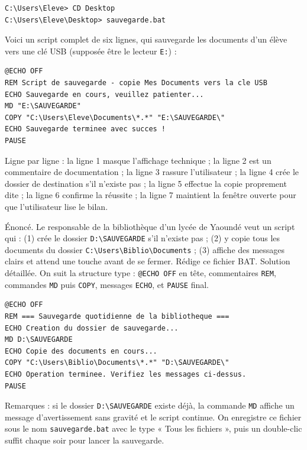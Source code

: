 \documentclass[11pt]{article}
\begin{document}
\begin{lstlisting}
C:\Users\Eleve> CD Desktop
C:\Users\Eleve\Desktop> sauvegarde.bat
\end{lstlisting}

\begin{exemplebox}
Voici un script complet de six lignes, qui sauvegarde les documents d'un élève vers une clé USB (supposée être le lecteur \texttt{E:}) :
\begin{lstlisting}
@ECHO OFF
REM Script de sauvegarde - copie Mes Documents vers la cle USB
ECHO Sauvegarde en cours, veuillez patienter...
MD "E:\SAUVEGARDE"
COPY "C:\Users\Eleve\Documents\*.*" "E:\SAUVEGARDE\"
ECHO Sauvegarde terminee avec succes !
PAUSE
\end{lstlisting}
Ligne par ligne : la ligne 1 masque l'affichage technique ; la ligne 2 est un commentaire de documentation ; la ligne 3 rassure l'utilisateur ; la ligne 4 crée le dossier de destination s'il n'existe pas ; la ligne 5 effectue la copie proprement dite ; la ligne 6 confirme la réussite ; la ligne 7 maintient la fenêtre ouverte pour que l'utilisateur lise le bilan.
\end{exemplebox}

\begin{exoresolu}
Énoncé. Le responsable de la bibliothèque d'un lycée de Yaoundé veut un script qui : (1) crée le dossier \texttt{D:\textbackslash SAUVEGARDE} s'il n'existe pas ; (2) y copie tous les documents du dossier \texttt{C:\textbackslash Users\textbackslash Biblio\textbackslash Documents} ; (3) affiche des messages clairs et attend une touche avant de se fermer. Rédige ce fichier BAT.
\tcblower
Solution détaillée. On suit la structure type : \texttt{@ECHO OFF} en tête, commentaires \texttt{REM}, commandes \texttt{MD} puis \texttt{COPY}, messages \texttt{ECHO}, et \texttt{PAUSE} final.
\begin{lstlisting}
@ECHO OFF
REM === Sauvegarde quotidienne de la bibliotheque ===
ECHO Creation du dossier de sauvegarde...
MD D:\SAUVEGARDE
ECHO Copie des documents en cours...
COPY "C:\Users\Biblio\Documents\*.*" "D:\SAUVEGARDE\"
ECHO Operation terminee. Verifiez les messages ci-dessus.
PAUSE
\end{lstlisting}
Remarques : si le dossier \texttt{D:\textbackslash SAUVEGARDE} existe déjà, la commande \texttt{MD} affiche un message d'avertissement sans gravité et le script continue. On enregistre ce fichier sous le nom \texttt{sauvegarde.bat} avec le type « Tous les fichiers », puis un double-clic suffit chaque soir pour lancer la sauvegarde.
\end{exoresolu}
\end{document}
